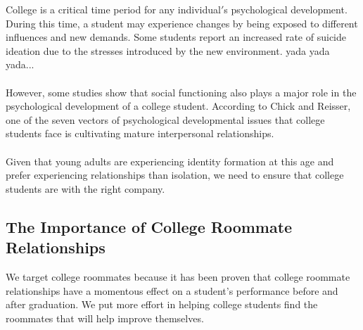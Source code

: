 \documentclass[journal]{./IEEE/IEEEtran}
\begin{document}
    College is a critical time period for any individual$'$s psychological development\cite{erb}. During this time, a student may experience changes by being exposed to different influences and new demands. Some students report an increased rate of suicide ideation \cite{sladek} due to the stresses introduced by the new environment. yada yada yada...
    \\
    \\
    However, some studies show that social functioning also plays a major role in the psychological development of a college student.
    According to Chick and Reisser, one of the seven vectors of psychological developmental issues that college students face is cultivating mature interpersonal relationships\cite{chickering}.
    \\
    \\
    Given that young adults are experiencing identity formation at this age and prefer experiencing relationships than isolation\cite{erb}, we need to ensure that college students are with the right company.

\subsection{The Importance of College Roommate Relationships}
    We target college roommates because it has been proven that college roommate relationships have a momentous effect on a student$’$s performance before and after graduation. We put more effort in helping college students find the roommates that will help improve themselves.
\end{document}
